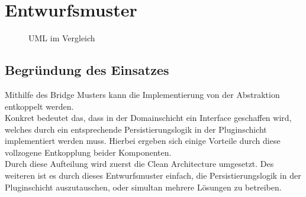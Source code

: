 \chapter{Entwurfsmuster}
	\begin{figure}[htb]
		\centering
		\qquad
		\caption{UML im Vergleich}%
	\end{figure}

	\section{Begründung des Einsatzes}
	Mithilfe des Bridge Musters kann die Implementierung von der Abstraktion entkoppelt werden. 
	\vspace{0.2cm} \\
	Konkret bedeutet das, dass in der Domainschicht ein Interface geschaffen wird, welches durch ein entsprechende Persistierungslogik in der Pluginschicht implementiert werden muss. Hierbei ergeben sich einige Vorteile durch diese vollzogene Entkopplung beider Komponenten. \\
	Durch diese Aufteilung wird zuerst die Clean Architecture umgesetzt. Des weiteren ist es durch dieses Entwurfsmuster einfach, die Persistierungslogik in der Pluginschicht auszutauschen, oder simultan mehrere Lösungen zu betreiben.
	


